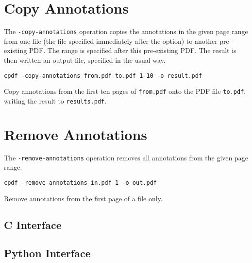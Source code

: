 \documentclass{book}
\begin{document}
  \section{Copy Annotations}
  The \texttt{-copy-annotations} operation copies the annotations in the given
page range from one file (the file specified immediately after the option) to
another pre-existing PDF. The range is specified after this pre-existing PDF.
The result is then written an output file, specified in the usual way.
  \begin{framed}
    \small\verb!cpdf -copy-annotations from.pdf to.pdf 1-10 -o result.pdf !
    
    \vspace{2.5mm}
    \noindent Copy annotations from the first ten pages of \texttt{from.pdf}
onto the PDF file \texttt{to.pdf}, writing the result to \texttt{results.pdf}.

  \end{framed}

  \section{Remove Annotations}
  The \texttt{-remove-annotations} operation removes all annotations from the
given page range.

  \begin{framed}
    \small\verb!cpdf -remove-annotations in.pdf 1 -o out.pdf!
    
    \vspace{2.5mm}
    \noindent Remove annotations from the first page of a file only.
  \end{framed}

\begin{cpdflib}
\clearpage
\section*{C Interface}
\begin{small}\tt

\end{small}
\end{cpdflib}

\begin{pycpdflib}
\clearpage
\section*{Python Interface}
\begin{small}\tt

\end{small}
\end{pycpdflib}
\end{document}
